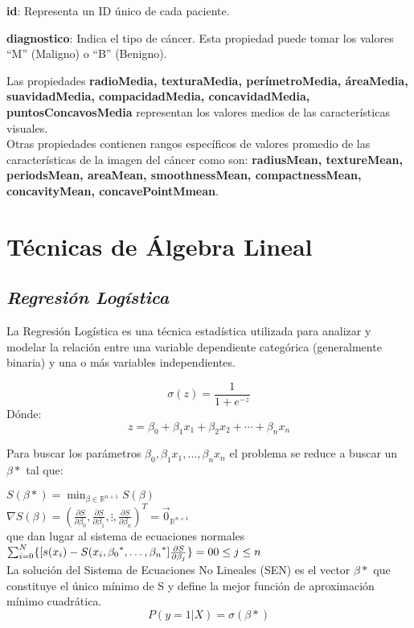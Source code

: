\documentclass[a4paper,10pt,twocolumn]{article}
\begin{document}
\textbf{id}: Representa un ID único de cada paciente.

\textbf{diagnostico}: Indica el tipo de cáncer. Esta propiedad puede tomar los valores “M” (Maligno) o “B” (Benigno).

Las propiedades \textbf{radioMedia, texturaMedia, perímetroMedia, áreaMedia, suavidadMedia, compacidadMedia, concavidadMedia, puntosConcavosMedia} representan los valores medios de las características visuales.\\
Otras propiedades contienen rangos específicos de valores promedio de las características de la imagen del cáncer como son:
\textbf{radiusMean, textureMean, periodsMean, areaMean, smoothnessMean, compactnessMean, concavityMean, concavePointMmean}.
\section{Técnicas de Álgebra Lineal}
\subsection{\textbf{\textit{Regresión Logística}}}

La Regresión Logística es una técnica estadística utilizada para analizar y modelar la relación entre una variable dependiente categórica (generalmente binaria) y una o más variables independientes.

\[
\sigma(z) = \frac{1}{1 + e^{-z}}
\]
Dónde:
\[
z = \beta_0 + \beta_1 x_1 + \beta_2 x_2 + \cdots + \beta_n x_n 
\]

Para buscar los parámetros  $\beta_0,\beta_1x_1,\dots,\beta_nx_n$ el problema se  reduce a buscar un $\beta*$ tal que:

$S(\beta*) = \min_{\beta \in \mathbb{R}^{n+1}} S(\beta)$\\

$ \nabla S(\beta) =(  
\frac{\partial S}{\partial \beta_0}, 
\frac{\partial S}{\partial \beta_1},
\vdots ,
\frac{\partial S}{\partial \beta_n} 
)^T = \overset{\rightarrow}{0}_{\mathbb{R}^{n+1}}$\\
 que dan lugar al sistema de ecuaciones normales\\
 $\sum_{i=0}^{N} \{[s(x_i)-S(x_i,{\beta_0}^*,\dots,{\beta_n}^*]\frac{\partial S}{\partial \beta_j}\}= 0\\    0 \leq j \leq n$\\

 La solución del Sistema de Ecuaciones No Lineales (SEN) es el vector $\beta*$ que constituye el único
mínimo de S y define la mejor función de aproximación mínimo cuadrática.\\
\[
P(y=1|X) =\sigma( \beta*)
\]
\end{document}

